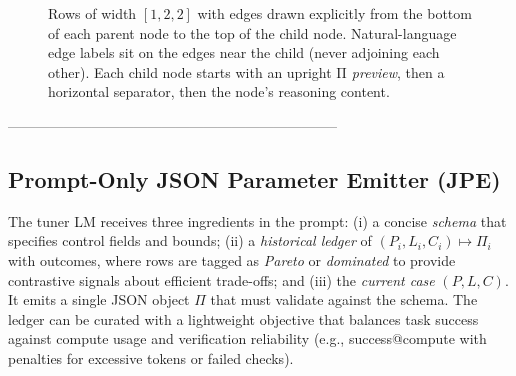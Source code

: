 \documentclass{article}
\theoremstyle{plain}
\theoremstyle{definition}
\theoremstyle{remark}
\begin{document}
\begin{figure*}[!t]
  \caption{Rows of width $[1,2,2]$ with edges drawn explicitly from the bottom of each parent node to the top of the child node. Natural-language edge labels sit on the edges near the child (never adjoining each other). Each child node starts with an upright \emph{$\mathrm{\Pi}$ preview}, then a horizontal separator, then the node’s reasoning content.}
  \label{fig:nlel_schematic}
\end{figure*}
 -----------------------------------------------------------------------

\subsection{Prompt-Only JSON Parameter Emitter (JPE)}
\label{subsec:jpe}
The tuner LM receives three ingredients in the prompt: (i) a concise \emph{schema} that specifies control fields and bounds; (ii) a \emph{historical ledger} of $(P_i,L_i,C_i)\!\mapsto\!\Pi_i$ with outcomes, where rows are tagged as \emph{Pareto} or \emph{dominated} to provide contrastive signals about efficient trade-offs; and (iii) the \emph{current case} $(P,L,C)$. It emits a single JSON object $\Pi$ that must validate against the schema. The ledger can be curated with a lightweight objective that balances task success against compute usage and verification reliability (e.g., success@compute with penalties for excessive tokens or failed checks).
\end{document}
